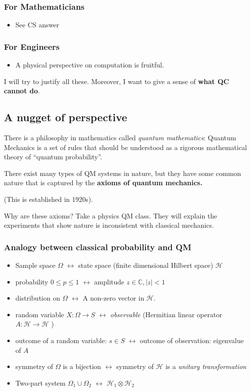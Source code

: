 \subsubsection{For Mathematicians}
\begin{itemize}
	\item See CS answer
\end{itemize}

\subsubsection{For Engineers}
\begin{itemize}
	\item A physical perspective on computation is fruitful. 
\end{itemize}

I will try to justify all these. Moreover, I want to give a sense of \textbf{what QC cannot do}.

\subsection{A nugget of perspective}

There is a philosophy in mathematics called \textit{quantum mathematics}: Quantum Mechanics is a set of rules that should be understood as a rigorous mathematical theory of ``quantum probability''. 

There exist many types of QM systems in nature, but they have some common nature that is captured by the \textbf{axioms of quantum mechanics.}

(This is established in 1920s). 

Why are these axioms? Take a physics QM class. They will explain the experiments that show nature is inconsistent with classical mechanics.

\subsubsection{Analogy between classical probability and QM}
\begin{itemize}
	\item Sample space $\Omega$ $\leftrightarrow$ state space (finite dimensional Hilbert space) $\mathscr{H}$ 
	\item probability $0 \le  p \le  1$ $\leftrightarrow$ amplitude $z \in \mathbb{C}, |z| < 1$
	\item distribution on $\Omega$ $\leftrightarrow$ A non-zero vector in $\mathscr{H}$.
	\item random variable $X: \Omega \to S$ $\leftrightarrow$ \textit{observable} (Hermitian linear operator $A: \mathscr{H} \to \mathscr{H}$ )
	\item outcome of a random variable: $s \in S$ $\leftrightarrow$ outcome of observation: eigenvalue of $A$
	\item symmetry of  $\Omega$ is a bijection $\leftrightarrow$ symmetry of $\mathscr{H}$ is a \textit{unitary transformation}
	\item Two-part system $\Omega_1 \cup \Omega_2$ $\leftrightarrow$ $\mathscr{H}_1 \otimes \mathscr{H}_2$
\end{itemize}

